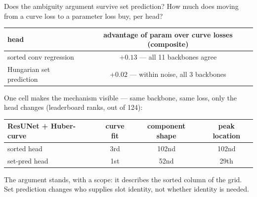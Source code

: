 \begin{frame}{Does the ambiguity argument survive set prediction?}
  \small
  How much does moving from a curve loss to a parameter loss buy, per head?
  \begin{center}
  \scriptsize
  \begin{tabular}{@{}lc@{}}
    \toprule
    head & advantage of param over curve losses (composite) \\
    \midrule
    sorted conv regression   & \textcolor{accent}{$\mathbf{+0.13}$} --- all 11 backbones agree \\
    \addlinespace[2pt]
    Hungarian set prediction & \textcolor{good}{$\mathbf{+0.02}$} --- within noise, all 3 backbones \\
    \bottomrule
  \end{tabular}
  \end{center}
  \vspace{2pt}
  One cell makes the mechanism visible --- same backbone, same loss, only the head
  changes (leaderboard ranks, out of 124):
  \begin{center}
  \scriptsize
  \begin{tabular}{@{}lccc@{}}
    \toprule
    ResUNet + Huber-curve & curve fit & component shape & peak location \\
    \midrule
    sorted head   & 3rd & \textcolor{accent}{102nd} & \textcolor{accent}{102nd} \\
    \addlinespace[2pt]
    set-pred head & 1st & \textcolor{good}{52nd}  & \textcolor{good}{29th}  \\
    \bottomrule
  \end{tabular}
  \end{center}
  {\scriptsize\color{accent} The argument stands, with a scope: it describes the sorted
  column of the grid. Set prediction changes who supplies slot identity, not whether
  identity is needed.\par}
\end{frame}

